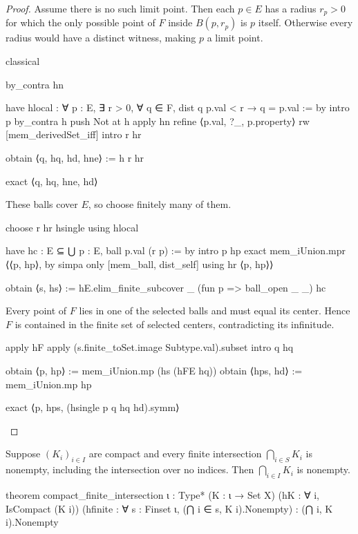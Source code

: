 \begin{proof}
  Assume there is no such limit point.
  Then each $p\in E$ has a radius $r_p>0$ for which the only possible point of $F$ inside
  $B(p,r_p)$ is $p$ itself.
  Otherwise every radius would have a distinct witness, making $p$ a limit point.

  \begin{lean}
    classical

    by_contra hn

    have hlocal : ∀ p : E, ∃ r > 0, ∀ q ∈ F, dist q p.val < r → q = p.val := by
      intro p
      by_contra h
      push Not at h
      apply hn
      refine ⟨p.val, ?_, p.property⟩
      rw [mem_derivedSet_iff]
      intro r hr

      obtain ⟨q, hq, hd, hne⟩ := h r hr

      exact ⟨q, hq, hne, hd⟩
  \end{lean}

  These balls cover $E$, so choose finitely many of them.

  \begin{lean}
    choose r hr hsingle using hlocal

    have hc : E ⊆ ⋃ p : E, ball p.val (r p) := by
      intro p hp
      exact mem_iUnion.mpr ⟨⟨p, hp⟩, by simpa only [mem_ball, dist_self] using hr ⟨p, hp⟩⟩

    obtain ⟨s, hs⟩ := hE.elim_finite_subcover _ (fun p => ball_open _ _) hc
  \end{lean}

  Every point of $F$ lies in one of the selected balls and must equal its center.
  Hence $F$ is contained in the finite set of selected centers, contradicting its infinitude.

  \begin{lean}
    apply hF
    apply (s.finite_toSet.image Subtype.val).subset
    intro q hq

    obtain ⟨p, hp⟩ := mem_iUnion.mp (hs (hFE hq))
    obtain ⟨hps, hd⟩ := mem_iUnion.mp hp

    exact ⟨p, hps, (hsingle p q hq hd).symm⟩
  \end{lean}

\end{proof}

\begin{theorem}
  \label{an1:thm:finite-compact-intersection-property}
  Suppose $(K_i)_{i\in I}$ are compact and every finite intersection $\bigcap_{i\in S}K_i$ is
  nonempty, including the intersection over no indices.
  Then $\bigcap_{i\in I}K_i$ is nonempty.

  \begin{lean}
    theorem compact_finite_intersection {ι : Type*} (K : ι → Set X)
        (hK : ∀ i, IsCompact (K i))
        (hfinite : ∀ s : Finset ι, (⋂ i ∈ s, K i).Nonempty) :
        (⋂ i, K i).Nonempty
  \end{lean}
\end{theorem}

